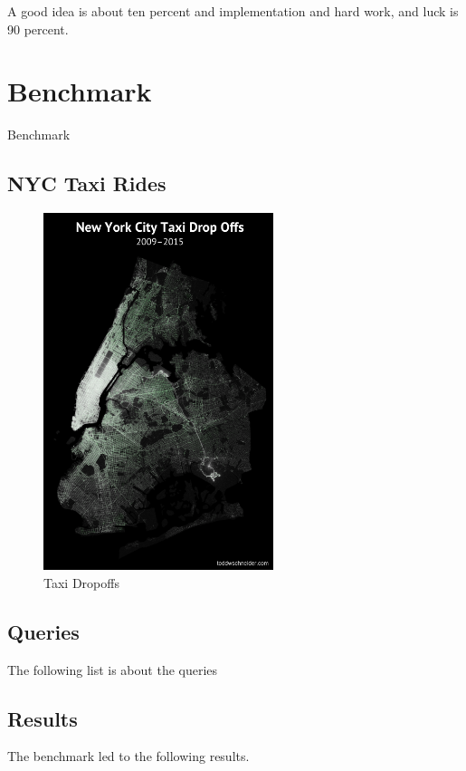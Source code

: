 \begin{savequote}[75mm]
A good idea is about ten percent and implementation and hard work, and luck is 90 percent.
\end{savequote}

\chapter{Benchmark}
Benchmark

\newpage

\section{NYC Taxi Rides}

\begin{figure}[H]
\centering
\captionsetup{justification=centering}
\includegraphics[width=0.6\textwidth]{images/taxi_dropoffs_map.png}
\caption[Taxi Dropoffs]{Taxi Dropoffs}
\end{figure}


\section{Queries}
The following list is about the queries

\section{Results}
The benchmark led to the following results.